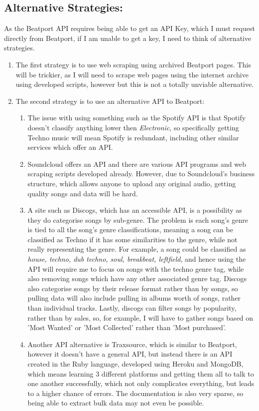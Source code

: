 \documentclass{article}
\begin{document}
\subsection{Alternative Strategies:}
As the Beatport API requires being able to get an API Key, which I must request directly from Beatport, if I am unable to get a key, I need to think of alternative strategies.
\begin{enumerate}
    \item The first strategy is to use web scraping using archived Beatport pages. This will be trickier, as I will need to scrape web pages using the internet archive using developed scripts, however but this is not a totally unviable alternative.
    \item The second strategy is to use an alternative API to Beatport:
    \begin{enumerate}
        \item The issue with using something such as the Spotify API is that Spotify doesn't classify anything lower then \textit{Electronic}, so specifically getting Techno music will mean Spotify is redundant, including other similar services which offer an API.
        \item Soundcloud offers an API and there are various API programs and web scraping scripts developed already. However, due to Soundcloud's business structure, which allows anyone to upload any original audio, getting quality songs and data will be hard.
        \item A site such as Discogs, which has an accessible API, is a possibility as they do categorise songs by sub-genre. The problem is each song's genre is tied to all the song's genre classifications, meaning a song can be classified as Techno if it has some similarities to the genre, while not really representing the genre. For example, a song could be classified as \textit{house, techno, dub techno, soul, breakbeat, leftfield}, and hence using the API will require me to focus on songs with the techno genre tag, while also removing songs which have any other associated genre tag. Discogs also categorise songs by their release format rather than by songs, so pulling data will also include pulling in albums worth of songs, rather than individual tracks. Lastly, discogs can filter songs by popularity, rather than by sales, so, for example, I will have to gather songs based on 'Most Wanted' or 'Most Collected' rather than 'Most purchased'.
        \item Another API alternative is Traxsource, which is similar to Beatport, however it doesn't have a general API, but instead there is an API created in the Ruby language, developed using Heroku and MongoDB, which means learning 3 different platforms and getting them all to talk to one another successfully, which not only complicates everything, but leads to a higher chance of errors. The documentation is also very sparse, so being able to extract bulk data may not even be possible.

\end{enumerate}
\end{enumerate}
\end{document}
